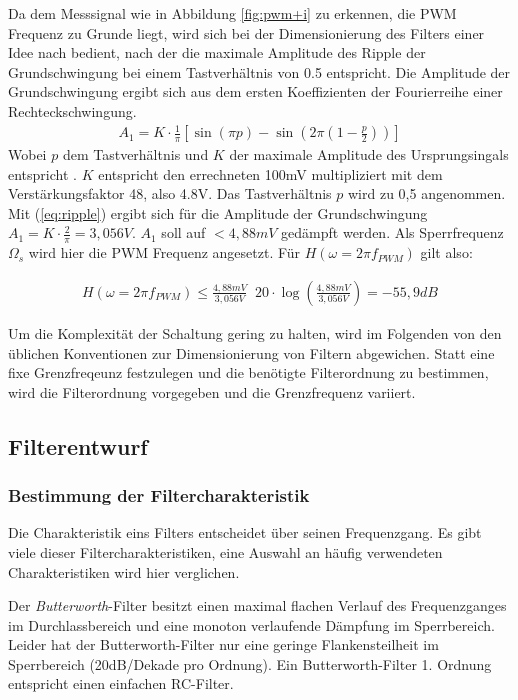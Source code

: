 Da dem Messsignal wie in Abbildung \ref{fig:pwm+i} zu erkennen, die PWM Frequenz zu Grunde liegt, wird sich bei der Dimensionierung des Filters einer Idee nach \cite{Alter2008} bedient, nach der die maximale Amplitude des Ripple der Grundschwingung bei einem
Tastverhältnis von 0.5 entspricht. Die Amplitude der Grundschwingung ergibt sich aus dem ersten Koeffizienten der Fourierreihe einer Rechteckschwingung.
\begin{align}
A_1 = K\cdot \frac{1}{\pi}[\sin(\pi p)-\sin(2\pi(1-\frac{p}{2}))]
\label{eq:ripple}
\end{align}
Wobei $p$ dem Tastverhältnis und $K$ der maximale Amplitude des Ursprungsingals entspricht \cite{Alter2008}. $K$ entspricht den errechneten 100mV multipliziert mit dem Verstärkungsfaktor 48, also 4.8V. 
Das Tastverhältnis $p$ wird zu 0,5
angenommen. Mit (\ref{eq:ripple}) ergibt sich für die Amplitude der Grundschwingung $ A_1 = K\cdot \frac{2}{\pi} = 3,056V$. $A_1$ soll auf $ < 4,88mV$ gedämpft werden.
Als Sperrfrequenz $\Omega_s $ wird hier die PWM Frequenz angesetzt. Für $H(\omega=2\pi f_{PWM})$ gilt also:

\begin{align}
H(\omega=2\pi f_{PWM}) \le \frac{4,88mV}{3,056V} \mathop{\hat{=}} 20\cdot\log(\frac{4,88mV}{3,056V})= -55,9 dB
\label{eq:daempfung}
\end{align}

Um die Komplexität der Schaltung gering zu halten, wird im Folgenden von den üblichen Konventionen zur Dimensionierung von Filtern abgewichen.
Statt eine fixe Grenzfreqeunz festzulegen und die benötigte Filterordnung zu bestimmen, wird die Filterordnung vorgegeben und die Grenzfrequenz variiert.

\subsection{Filterentwurf}

\subsubsection{Bestimmung der Filtercharakteristik}

Die Charakteristik eins Filters entscheidet über seinen Frequenzgang. Es gibt viele dieser Filtercharakteristiken, eine Auswahl an häufig verwendeten Charakteristiken wird hier verglichen.

Der \emph{Butterworth}-Filter besitzt einen maximal flachen Verlauf des Frequenzganges im Durchlassbereich und eine monoton verlaufende Dämpfung im Sperrbereich.
Leider hat der Butterworth-Filter nur eine geringe Flankensteilheit im Sperrbereich (20dB/Dekade pro Ordnung). Ein Butterworth-Filter 1. Ordnung entspricht einen  einfachen RC-Filter.

